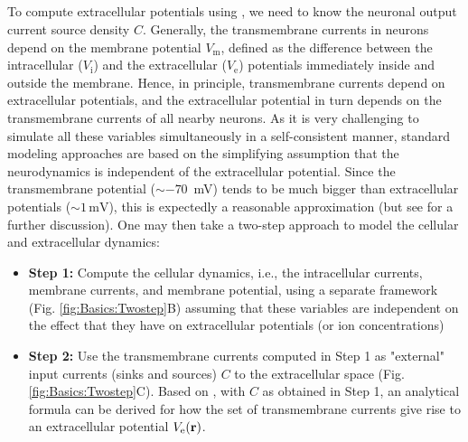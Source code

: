 \subsection{}
\label{sec:Basics:twostep}
To compute extracellular potentials using , we need to know the neuronal output current source density $C$. Generally, the transmembrane currents in neurons depend on the membrane potential $V_\text{m}$, defined as the difference between the intracellular ($V_\text{i}$) and the extracellular ($V_\text{e}$) potentials immediately inside and outside the membrane. Hence, in principle, transmembrane currents depend on extracellular potentials, and the extracellular potential in turn depends on the transmembrane currents of all nearby neurons. As it is very challenging to simulate all these variables simultaneously in a self-consistent manner, standard modeling approaches are based on the simplifying assumption that the neurodynamics is independent of the extracellular potential. Since the transmembrane potential ($\sim -70$~\si{\milli\volt}) tends to be much bigger than extracellular potentials ($\sim 1 \,\si{\milli\volt}$), this is expectedly a reasonable approximation (but see  for a further discussion). One may then take a two-step approach to model the cellular and extracellular dynamics:

\begin{itemize}
\item {\bf Step 1:}  Compute the cellular dynamics, i.e., the intracellular currents, membrane currents, and membrane potential, using a separate framework (Fig. \ref{fig:Basics:Twostep}B) assuming that these variables are independent on the effect that they have on extracellular potentials (or ion concentrations) 


\item {\bf Step 2:} Use the transmembrane currents computed in Step 1 as "external" input currents (sinks and sources) $C$ to the extracellular space (Fig. \ref{fig:Basics:Twostep}C). Based on , with $C$ as obtained in Step 1, an analytical formula can be derived for how the set of transmembrane currents give rise to an extracellular potential $V_\text{e}({\bf r})$.
\end{itemize}

